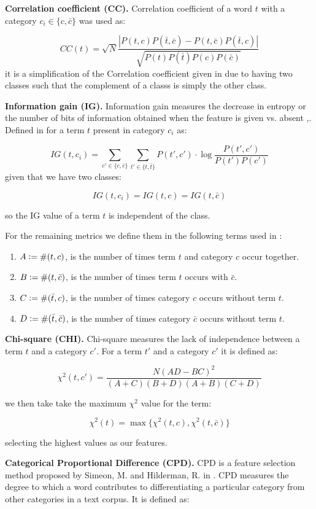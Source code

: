 \documentclass[10pt, a4paper]{article}
\begin{document}
\textbf{Correlation coefficient (CC).} Correlation coefficient of a word $t$ with a category $c_i \in \{c,\bar{c}\}$ was used as:

$$ CC(t) = \sqrt{N} \frac{| P(t,c)P(\bar{t},\bar{c}) - P(t,\bar{c})P(\bar{t},c) |}
				{\sqrt{P(t)P(\bar{t})P(c)P(\bar{c})}}
$$
it is a simplification of the Correlation coefficient given in \cite{IG} due to having two classes such that the complement of a classs is simply the other class.

\textbf{Information gain (IG).} Information gain measures the decrease in entropy or the number of bits of information obtained when the feature is given vs. absent \cite{Empirical},\cite{IG}. Defined in \cite{IG} for a term $t$ present in category $c_i$ as:

$$ IG(t,c_i) = \sum\limits_{c'\in\{ c,\bar{c} \}} \sum\limits_{t'\in\{ t,\bar{t} \}} P(t',c') \cdot \log \frac{P(t',c')}{P(t')P(c')} $$
given that we have two classes:

$$ IG(t,c_i) = IG(t,c) = IG(t,\bar{c}) $$

so the IG value of a term $t$ is independent of the class.

For the remaining metrics we define them in the following terms used in \cite{CPD}:
\begin{enumerate}
\item $A \vcentcolon =\#(t,c)$, is the number of times term $t$ and category $c$ occur together.
\item $B \vcentcolon =\#(t,\bar{c})$, is the number of times term $t$ occurs with $\bar{c}$.
\item $C \vcentcolon =\#(\bar{t},c)$, is the number of times category $c$ occurs without term $t$.
\item $D \vcentcolon =\#(\bar{t},\bar{c})$, is the number of times category $\bar{c}$ occurs without term $t$.
\end{enumerate}

\textbf{Chi-square (CHI).} Chi-square measures the lack of independence between a term $t$ and a category $c'$. For a term $t'$ and a category $c'$ it is defined as:

$$\chi^2 (t,c') = \frac{N(AD-BC)^2}{(A+C)(B+D)(A+B)(C+D)}$$

we then take take the maximum $\chi^2$ value for the term:

$$\chi^2 (t) = \max\{\chi^2(t,c),\chi^2(t,\bar{c})\} $$

selecting the highest values as our features.

\textbf{Categorical Proportional Difference (CPD).} CPD is a feature selection method proposed by Simeon, M. and Hilderman, R. in \cite{CPD}. CPD measures the degree to which a word contributes to differentiating a particular category from other categories in a text corpus. It is defined as:
\end{document}

